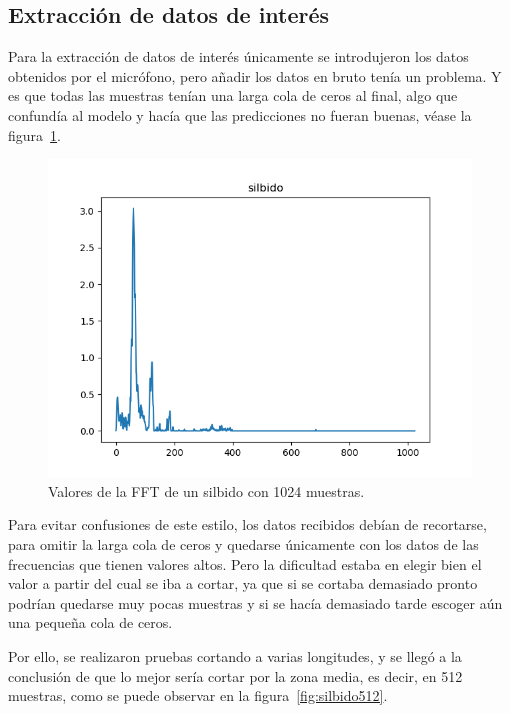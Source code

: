 \documentclass[a4paper, 12pt]{book}
\begin{document}
\subsection{Extracción de datos de interés}
\label{subsec:extraccion-datos}

Para la extracción de datos de interés únicamente se introdujeron los datos obtenidos por el micrófono, pero añadir los datos en bruto tenía un problema. Y es que todas las muestras tenían una larga cola de ceros al final, algo que confundía al modelo y hacía que las predicciones no fueran buenas, véase la figura~\ref{fig:silbido1024}.

\begin{figure}
	\centering
	\includegraphics[width=12cm, keepaspectratio]{img/silbido1024.png}
	\caption{Valores de la FFT de un silbido con 1024 muestras.}\label{fig:silbido1024}
\end{figure}

Para evitar confusiones de este estilo, los datos recibidos debían de recortarse, para omitir la larga cola de ceros y quedarse únicamente con los datos de las frecuencias que tienen valores altos. Pero la dificultad estaba en elegir bien el valor a partir del cual se iba a cortar, ya que si se cortaba demasiado pronto podrían quedarse muy pocas muestras y si se hacía demasiado tarde escoger aún una pequeña cola de ceros.

Por ello, se realizaron pruebas cortando a varias longitudes, y se llegó a la conclusión de que lo mejor sería cortar por la zona media, es decir, en 512 muestras, como se puede observar en la figura~\ref{fig:silbido512}.
\end{document}
